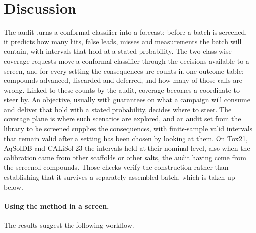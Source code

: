 \documentclass[twocolumn,10pt]{article}
\begin{document}
\section{Discussion}
\label{sec:discussion}

The audit turns a conformal classifier into a forecast: before a batch is screened, it predicts how many hits, false leads, misses and measurements the batch will contain, with intervals that hold at a stated probability. The two class-wise coverage requests move a conformal classifier through the decisions available to a screen, and for every setting the consequences are counts in one outcome table: compounds advanced, discarded and deferred, and how many of those calls are wrong. Linked to these counts by the audit, coverage becomes a coordinate to steer by. An objective, usually with guarantees on what a campaign will consume and deliver that hold with a stated probability, decides where to steer. The coverage plane is where such scenarios are explored, and an audit set from the library to be screened supplies the consequences, with finite-sample valid intervals that remain valid after a setting has been chosen by looking at them. On Tox21, AqSolDB and CALiSol-23 the intervals held at their nominal level, also when the calibration came from other scaffolds or other salts, the audit having come from the screened compounds. Those checks verify the construction rather than establishing that it survives a separately assembled batch, which is taken up below.

\paragraph{Using the method in a screen.} The results suggest the following workflow.
\end{document}
